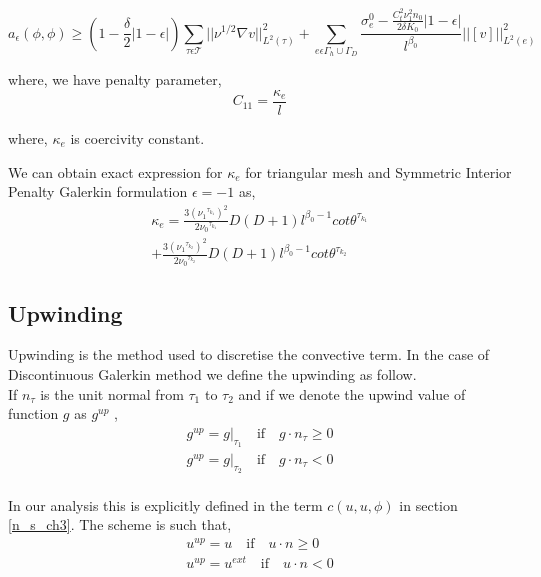 \documentclass[a4paper]{book}
\begin{document}
\begin{equation}
a_\epsilon (\phi , \phi) \geq \left( 1-\frac{\delta}{2} |1-\epsilon| \right) \sum_{\tau \epsilon \mathcal{T}} ||\nu^{1/2} \nabla v ||^2_{L^2(\tau)} + \sum_{e \epsilon \Gamma_h \cup \Gamma_D} \frac{\sigma_e^0 - \frac{C_t^2 \nu_1^2 n_0}{2 \delta K_0}|1-\epsilon|}{l^{\beta_0}} ||[v]||^2_{L^2(e)}
\end{equation}

where, we have penalty parameter,
\begin{equation}
C_{11} = \frac{\kappa_e}{l}
\end{equation} 

where, $\kappa_e$ is coercivity constant.

We can obtain exact expression for $\kappa_e$ for triangular mesh and Symmetric Interior Penalty Galerkin formulation $\epsilon = -1$ as,\\
\begin{equation}
\begin{split}
\kappa_e = \frac{3 ( {\nu_1}^{\tau_{k_1}})^2}{2 {\nu_0}^{\tau_{k_1}}} D (D+1) l^{\beta_0 - 1} cot {\theta^{\tau_{k_1}}}  \\ + \frac{3 ( {\nu_1}^{\tau_{k_2}})^2}{2 {\nu_0}^{\tau_{k_2}}} D (D+1) l^{\beta_0 - 1} cot {\theta^{\tau_{k_2}}}
\end{split}
\end{equation} 

\subsection{Upwinding} \label{upwinding}

Upwinding is the method used to discretise the convective term. In the case of Discontinuous Galerkin method we define the upwinding as follow.\\

If $n_\tau$ is the unit normal from $\tau_1$ to $\tau_2$ and if we denote the upwind value of function $g$ as $g^{up}$ \cite{riviere},
\begin{equation}
\begin{split}
g^{up} = g|_{\tau_1} \quad \textrm{if} \quad g \cdot n_\tau \geq 0 \\
g^{up} = g|_{\tau_2} \quad \textrm{if} \quad g \cdot n_\tau < 0
\end{split}
\end{equation}
\\
In our analysis this is explicitly defined in the term $c(u,u,\phi)$ in section \ref{n_s_ch3}. The scheme is such that,
\begin{equation}
\begin{split}
u^{up} = u \quad \textrm{if} \quad u \cdot n \geq 0 \\
u^{up} = u^{ext} \quad \textrm{if} \quad u \cdot n < 0
\end{split}
\end{equation}
\end{document}
